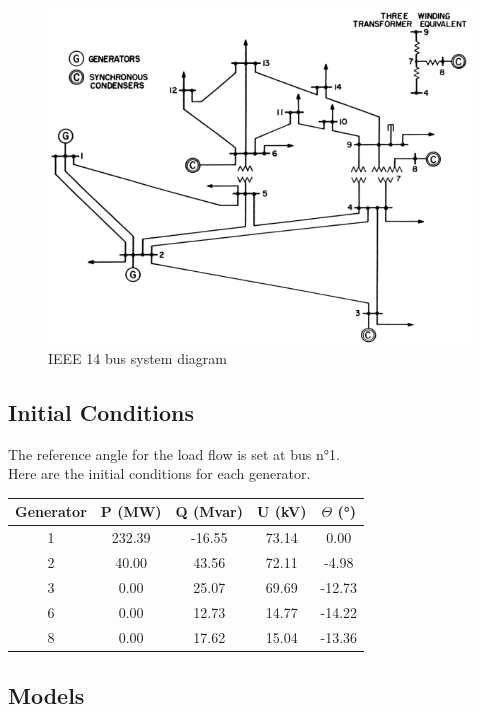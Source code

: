 \documentclass[a4paper, 12pt]{report}
\begin{document}
\begin{figure}[H]
  \includegraphics[width=\textwidth]{Single-line-diagram-of-IEEE-14-bus-system.png}
  \caption{IEEE 14 bus system diagram}
\end{figure}

\subsection{Initial Conditions}

The reference angle for the load flow is set at bus n°1. \\

Here are the initial conditions for each generator.

\begin{center}
\begin{tabular}{|c|c|c|c|c|}
  \hline
  Generator & P (MW) & Q (Mvar) & U (kV) & $\Theta$ (°) \\
  \hline
  1 & 232.39 & -16.55 & 73.14 & 0.00\\
  2 & 40.00 & 43.56 & 72.11 & -4.98\\
  3 & 0.00 & 25.07 & 69.69 & -12.73\\
  6 & 0.00 & 12.73 & 14.77 & -14.22\\
  8 & 0.00 & 17.62 & 15.04 & -13.36\\
  \hline
\end{tabular}
\end{center}

\subsection{Models}
\label{ModelsIEEE}
\end{document}
